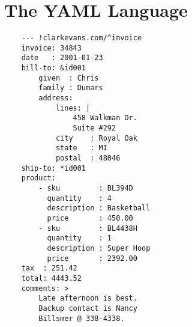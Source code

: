 \documentclass[11pt]{article}
\begin{document}
  \section{The YAML Language}
  \begin{verbatim}
    --- !clarkevans.com/^invoice
    invoice: 34843
    date   : 2001-01-23
    bill-to: &id001
        given  : Chris
        family : Dumars
        address:
            lines: |
                458 Walkman Dr.
                Suite #292
            city    : Royal Oak
            state   : MI
            postal  : 48046
    ship-to: *id001
    product:
        - sku         : BL394D
          quantity    : 4
          description : Basketball
          price       : 450.00
        - sku         : BL4438H
          quantity    : 1
          description : Super Hoop
          price       : 2392.00
    tax  : 251.42
    total: 4443.52
    comments: >
        Late afternoon is best.
        Backup contact is Nancy
        Billsmer @ 338-4338.
  \end{verbatim}
\end{document}
